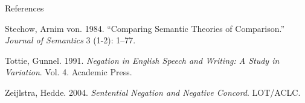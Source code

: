 \documentclass[
  ignorenonframetext,
]{beamer}
\newlength{\cslhangindent}
\newlength{\cslentryspacingunit} %
\newenvironment{CSLReferences}[2] %
 {%
  \setlength{\parindent}{0pt}
  \ifodd #1
  \let\oldpar\par
  \def\par{\hangindent=\cslhangindent\oldpar}
  \fi
  \setlength{\parskip}{#2\cslentryspacingunit}
 }%
 {}
\begin{document}
\begin{frame}{References}
\begin{CSLReferences}{1}{0}
\leavevmode{}%
Stechow, Arnim von. 1984. {``Comparing Semantic Theories of
Comparison.''} \emph{Journal of Semantics} 3 (1-2): 1--77.

\leavevmode{}%
Tottie, Gunnel. 1991. \emph{Negation in English Speech and Writing: A
Study in Variation}. Vol. 4. Academic Press.

\leavevmode{}%
Zeijlstra, Hedde. 2004. \emph{Sentential Negation and Negative Concord}.
LOT/ACLC.

\end{CSLReferences}
\end{frame}
\end{document}
